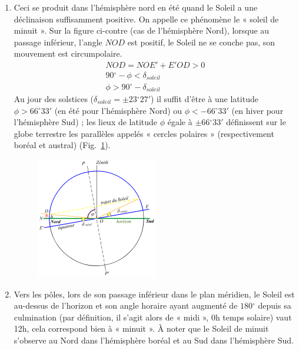 \documentclass[a4paper,10pt]{report}
\renewcommand{\deg}{\ensuremath{^{\circ}}}
\begin{document}
\begin{Answer}
\begin{enumerate}
  \item Ceci se produit dans l'hémisphère nord en été quand le Soleil
    a une déclinaison suffisamment positive. On appelle ce phénomène
    le « soleil de minuit ». Sur la figure ci-contre (cas de
    l'hémisphère Nord), lorsque au passage inférieur, l'angle $NOD$
    est positif, le Soleil ne se couche pas, son mouvement est
    circumpolaire.
    \begin{align*}
      NOD = NOE' + E'OD > 0 \\
      90\deg - \phi < \delta_{soleil} \\
      \phi > 90\deg - \delta_{soleil}
    \end{align*}
    Au jour des solstices ($\delta_{soleil} = \pm 23\deg27'$) il
    suffit d'être à une latitude $\phi > 66\deg33'$ (en été pour
    l'hémisphère Nord) ou $\phi < - 66\deg33'$ (en hiver pour
    l'hémisphère Sud) ; les lieux de latitude $\phi$ égale à $\pm
    66\deg33'$ définissent sur le globe terrestre les parallèles
    appelés « cercles polaires » (respectivement boréal et austral)
    (Fig.~\ref{mvtsolaire2}).

    \begin{figure}[htp]
      \centering
      \includegraphics[width=0.5\textwidth]{mvt_soleil2}
      \label{mvtsolaire2}
      \caption{}
    \end{figure}

  \item Vers les pôles, lors de son passage inférieur dans le plan
    méridien, le Soleil est au-dessus de l'horizon et son angle
    horaire ayant augmenté de $180\deg$ depuis sa culmination (par
    définition, il s'agit alors de « midi », 0h temps solaire) vaut
    12h, cela correspond bien à « minuit ». À noter que le Soleil de
    minuit s'observe au Nord dans l'hémisphère boréal et au Sud dans
    l'hémisphère Sud.


\end{enumerate}
\end{Answer}
\end{document}
